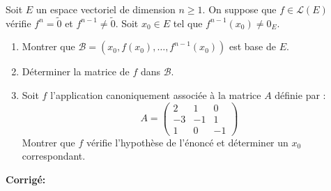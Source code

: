 \documentclass[a4paper,twoside,french,11pt]{VcCours}
\newcommand{\corr}{\textbf{Corrigé:}}
\begin{document}
\begin{Exercice}{} Soit $E$ un espace vectoriel de dimension $n \geq 1$. On suppose que $f \in \mathcal{L}(E)$ vérifie $f^n = \tilde{0}$ et $f^{n-1} \neq \tilde{0}$. Soit $x_0 \in E$ tel que $f^{n-1}(x_0) \neq 0_E$.

\begin{enumerate}
\item Montrer que $\mathcal{B}= (x_0, f(x_0), \ldots, f^{n-1}(x_0))$ est base de $E$. 
\item Déterminer la matrice de $f$ dans $\mathcal{B}$.
\item Soit $f$ l'application canoniquement associée à la matrice $A$ définie par :
$$ A = \begin{pmatrix}
2 & 1 & 0 \\
-3 & -1 & 1 \\
1 & 0 & -1 
\end{pmatrix}$$
Montrer que $f$ vérifie l'hypothèse de l'énoncé et déterminer un $x_0$ correspondant.
\end{enumerate}
\end{Exercice}

\corr 
\end{document}
